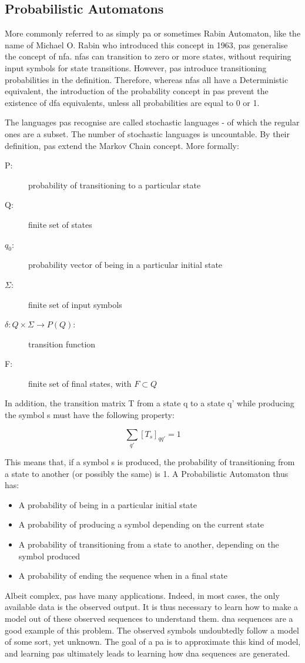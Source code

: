 
\subsection{Probabilistic Automatons}
More commonly referred to as simply \gls{pa} or
sometimes Rabin Automaton, like the name of Michael O. Rabin who introduced
this concept in 1963, \gls{pa}s generalise the concept of \gls{nfa}. \gls{nfa}s can transition to zero or more states,
without requiring input symbols for state transitions. However, \gls{pa}s
introduce transitioning probabilities in the definition. Therefore,
whereas \gls{nfa}s all have a Deterministic equivalent, the introduction
of the probability concept in \gls{pa}s prevent the existence of \gls{dfa} equivalents,
unless all probabilities are equal to 0 or 1.

The languages \gls{pa}s recognise are called stochastic languages \cite{macarie} - of which
the regular ones are a subset. The number of stochastic languages is uncountable.
By their definition, \gls{pa}s extend the Markov Chain concept. More formally:

\begin{description}
	\item [{P:}] probability of transitioning to a particular state
	\item [{Q:}] finite set of states
	\item [{$q_{0}$:}] probability vector of being in a particular initial
	state
	\item [{$\varSigma$:}] finite set of input symbols
	\item [{$\delta:Q\times\varSigma\longrightarrow P(Q)$:}] transition function
	\item [{F:}] finite set of final states, with $F\subset Q$
\end{description}

In addition, the transition matrix T from a state q to a state q'
while producing the symbol s must have the following property:

\[
\sum_{q'}[T_{s}]_{qq'}=1
\]


This means that, if a symbol s is produced, the probability of transitioning
from a state to another (or possibly the same) is 1. A Probabilistic
Automaton thus has:
\begin{itemize}
\item A probability of being in a particular initial state
\item A probability of producing a symbol depending on the current state
\item A probability of transitioning from a state to another, depending
on the symbol produced
\item A probability of ending the sequence when in a final state
\end{itemize}
Albeit complex, \gls{pa}s have many applications. Indeed, in most cases,
the only available data is the observed output. It is thus necessary
to learn how to make a model out of these observed sequences to understand
them. \gls{dna} sequences are a good example of this problem. The observed
symbols undoubtedly follow a model of some sort, yet unknown. The
goal of a \gls{pa} is to approximate this kind of model, and learning \gls{pa}s
ultimately leads to learning how \gls{dna} sequences are generated.